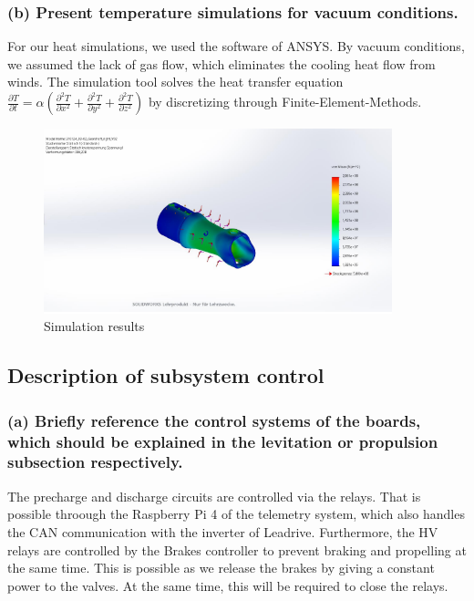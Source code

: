 \subsubsection{(b) Present temperature simulations for vacuum conditions.}
For our heat simulations, we used the software of ANSYS. By vacuum conditions, we assumed the
lack of gas flow, which eliminates the cooling heat flow from winds. The simulation tool solves
the heat transfer equation \( \frac{\partial T}{\partial t} = \alpha \left( \frac{\partial^2 T}{\partial x^2} + \frac{\partial^2 T}{\partial y^2} + \frac{\partial^2 T}{\partial z^2} \right) \)
by discretizing through Finite-Element-Methods.
\begin{figure}[H]
    \centering
    \includegraphics[width=0.9\textwidth]{texfiles/elec/eimg/SimulationTemplate}
    \caption{Simulation results}
    \label{img: simresults_battery}
\end{figure}


\subsection{Description of subsystem control}
\subsubsection{(a) Briefly reference the control systems of the boards, which should be explained in the levitation or propulsion subsection respectively.}
The precharge and discharge circuits are controlled via the relays. That is possible throough the Raspberry Pi 4 of the telemetry system, which also handles the CAN communication with the inverter of Leadrive. Furthermore, the HV relays are controlled by the Brakes controller to prevent braking and propelling at the same time. This is possible as we release the brakes by giving a constant power to the valves. At the same time, this will be required to close the relays. 


